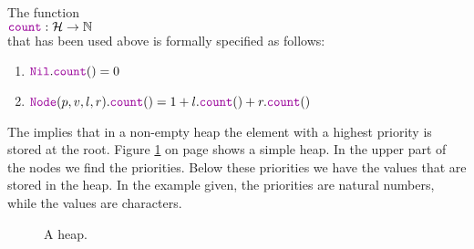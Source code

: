 The function 
\\[0.2cm]
\hspace*{1.3cm}
$\mytt{count}:\mathcal{H} \rightarrow \mathbb{N}$
\\[0.2cm]
that has been used above is formally specified as follows:
\begin{enumerate}
\item $\mytt{Nil}.\mytt{count}() = 0$
\item $\mytt{Node}(p,v,l,r).\mytt{count}() = 1 + l.\mytt{count}() + r.\mytt{count}()$
\end{enumerate}

The   implies that in a non-empty heap the element with a highest priority is
stored at the root.  Figure \ref{fig:heap-list} on page \pageref{fig:heap-list} shows a simple heap.
In the upper part of the nodes we find the priorities.  Below these priorities we have the values
that are stored in the heap.  In the example given, the priorities are natural numbers, while the
values are characters.


\begin{figure}[!t]
  \centering
  \caption{A heap.}
  \label{fig:heap-list}
\end{figure}

